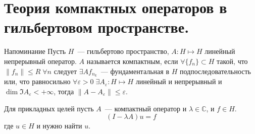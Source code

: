 \documentclass[14pt]{extarticle}
\begin{document}
\section*{Теория компактных операторов в гильбертовом пространстве.}
\begin{MathCl}{Напоминание}
    Пусть  $H$~--- гильбертово пространство, $A : H \mapsto H$ линейный
    непрерывный оператор.
    $A$ называется компактным, если $\forall\{f_n\} \subset H$ такой, что
    $\|f_n\|\le R\;\forall n$ следует $\exists A f_{n_k}$~--- фундаментальная
    в $H$ подпоследовательность или, что равносильно $\forall \varepsilon > 0
    \;\exists A_\varepsilon : H \mapsto H$ линейный и непрерывный и $\dim \Im
    A_\varepsilon < + \infty$, тогда $\|A - A_\varepsilon\| \le \varepsilon$.
\end{MathCl}

Для прикладных целей пусть $A$~--- компактный оператор и $\lambda \in
\mathbb C$, и $f \in H$.
$$
(I - \lambda A)u = f
$$
где $u \in H$ и нужно найти $u$.
\end{document}
